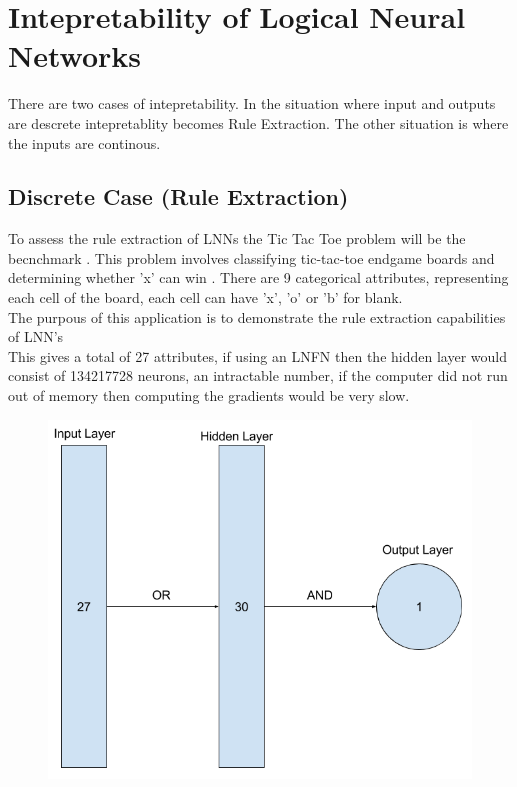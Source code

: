 \section{Intepretability of Logical Neural Networks}
There are two cases of intepretability. In the situation where input and outputs are descrete intepretablity becomes Rule Extraction. The other situation is where the inputs are continous.

\subsection{Discrete Case (Rule Extraction)}
To assess the rule extraction of LNNs the Tic Tac Toe problem will be the becnchmark \cite{Lichman:2013}. This problem involves classifying tic-tac-toe endgame boards and determining whether 'x' can win . There are 9 categorical attributes, representing each cell of the board, each cell can have 'x', 'o' or 'b' for blank.\\

The purpous of this application is to demonstrate the rule extraction capabilities of LNN's\\

This gives a total of 27 attributes, if using an LNFN then the hidden layer would consist of 134217728 neurons, an intractable number, if the computer did not run out of memory then computing the gradients would be very slow.

\begin{figure}[H]
	\centering
	\begin{minipage}[b]{0.5\textwidth}
		\includegraphics[width=\textwidth]{Tic-Tac-Toe-Net.png}
		\caption{}
		\label{fig:tic-tac-toe-net}
	\end{minipage}
	\hfill
\end{figure}

